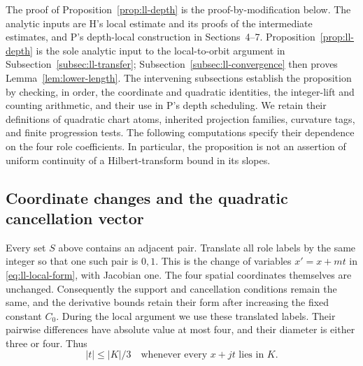 The proof of Proposition~\ref{prop:ll-depth} is the proof-by-modification
below.  The analytic inputs are H's local estimate and its proofs of the
intermediate estimates, and P's depth-local construction in Sections~4--7.
Proposition~\ref{prop:ll-depth} is the sole analytic input to the
local-to-orbit argument in Subsection~\ref{subsec:ll-transfer};
Subsection~\ref{subsec:ll-convergence} then proves
Lemma~\ref{lem:lower-length}.  The intervening subsections establish
the proposition by checking, in order, the coordinate and quadratic
identities, the integer-lift and counting arithmetic, and their
use in P's depth scheduling.
We retain their definitions of quadratic chart atoms, inherited
projection families, curvature tags, and finite progression tests.  The
following computations specify their dependence on the four role
coefficients.  In particular, the proposition is not an assertion of
uniform continuity of a Hilbert-transform bound in its slopes.

\subsection{Coordinate changes and the quadratic cancellation vector}
\label{subsec:ll-algebra}

Every set $S$ above contains an adjacent pair.  Translate all role
labels by the same integer so that one such pair is $0,1$.  This is the
change of variables $x'=x+mt$ in \eqref{eq:ll-local-form}, with
Jacobian one.  The four spatial coordinates themselves are unchanged.
Consequently the support and cancellation conditions remain the same,
and the derivative bounds retain their form after increasing the fixed
constant $C_0$.  During the local argument we use these translated
labels.  Their pairwise differences have absolute value at most four,
and their diameter is either three or four.  Thus
\begin{equation}
 |t|\le |K|/3
 \quad\text{whenever every }x+jt\text{ lies in }K.
 \label{eq:ll-support-t}
\end{equation}

